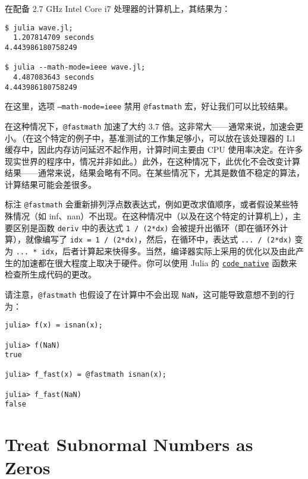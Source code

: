 在配备 2.7 GHz Intel Core i7 处理器的计算机上，其结果为：




\begin{lstlisting}
$ julia wave.jl;
  1.207814709 seconds
4.443986180758249

$ julia --math-mode=ieee wave.jl;
  4.487083643 seconds
4.443986180758249
\end{lstlisting}



在这里，选项 \texttt{--math-mode=ieee} 禁用 \texttt{@fastmath} 宏，好让我们可以比较结果。



在这种情况下，\texttt{@fastmath} 加速了大约 3.7 倍。这非常大——通常来说，加速会更小。（在这个特定的例子中，基准测试的工作集足够小，可以放在该处理器的 L1 缓存中，因此内存访问延迟不起作用，计算时间主要由 CPU 使用率决定。在许多现实世界的程序中，情况并非如此。）此外，在这种情况下，此优化不会改变计算结果——通常来说，结果会略有不同。在某些情况下，尤其是数值不稳定的算法，计算结果可能会差很多。



标注 \texttt{@fastmath} 会重新排列浮点数表达式，例如更改求值顺序，或者假设某些特殊情况（如 inf、nan）不出现。在这种情况中（以及在这个特定的计算机上），主要区别是函数 \texttt{deriv} 中的表达式 \texttt{1 / (2*dx)} 会被提升出循环（即在循环外计算），就像编写了 \texttt{idx = 1 / (2*dx)}，然后，在循环中，表达式 \texttt{... / (2*dx)} 变为 \texttt{... * idx}，后者计算起来快得多。当然，编译器实际上采用的优化以及由此产生的加速都在很大程度上取决于硬件。你可以使用 Julia 的 \hyperlink{2534314152947301270}{\texttt{code\_native}} 函数来检查所生成代码的更改。



请注意，\texttt{@fastmath} 也假设了在计算中不会出现 \texttt{NaN}，这可能导致意想不到的行为：




\begin{verbatim}
julia> f(x) = isnan(x);

julia> f(NaN)
true

julia> f_fast(x) = @fastmath isnan(x);

julia> f_fast(NaN)
false
\end{verbatim}



\hypertarget{12370344689233780157}{}


\section{Treat Subnormal Numbers as Zeros}




